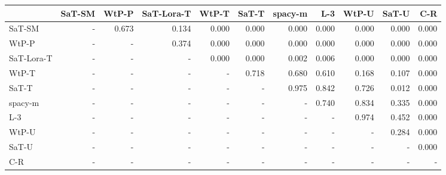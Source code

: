\begin{tabular}{lrrrrrrrrrr}
\toprule
 & SaT-SM & WtP-P & SaT-Lora-T & WtP-T & SaT-T & spacy-m & L-3 & WtP-U & SaT-U & C-R \\
\midrule
SaT-SM & - & 0.673 & 0.134 & 0.000 & 0.000 & 0.000 & 0.000 & 0.000 & 0.000 & 0.000 \\
WtP-P & - & - & 0.374 & 0.000 & 0.000 & 0.000 & 0.000 & 0.000 & 0.000 & 0.000 \\
SaT-Lora-T & - & - & - & 0.000 & 0.000 & 0.002 & 0.006 & 0.000 & 0.000 & 0.000 \\
WtP-T & - & - & - & - & 0.718 & 0.680 & 0.610 & 0.168 & 0.107 & 0.000 \\
SaT-T & - & - & - & - & - & 0.975 & 0.842 & 0.726 & 0.012 & 0.000 \\
spacy-m & - & - & - & - & - & - & 0.740 & 0.834 & 0.335 & 0.000 \\
L-3 & - & - & - & - & - & - & - & 0.974 & 0.452 & 0.000 \\
WtP-U & - & - & - & - & - & - & - & - & 0.284 & 0.000 \\
SaT-U & - & - & - & - & - & - & - & - & - & 0.000 \\
C-R & - & - & - & - & - & - & - & - & - & - \\
\bottomrule
\end{tabular}

